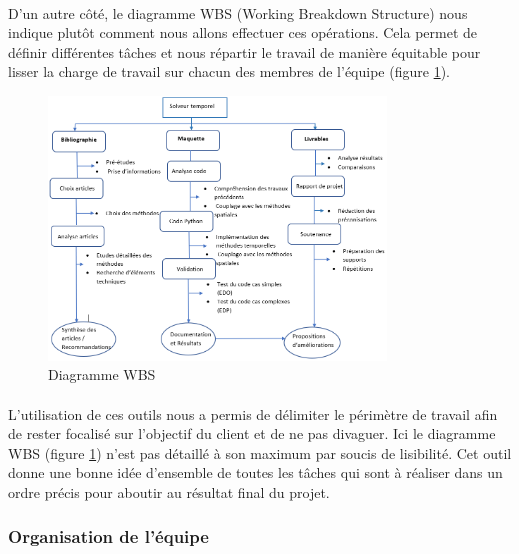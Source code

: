         \paragraph{}
        D'un autre côté, le diagramme WBS (Working Breakdown Structure) nous indique plutôt comment nous allons effectuer ces opérations. Cela permet de définir différentes tâches et nous répartir le travail de manière équitable pour lisser la charge de travail sur chacun des membres de l'équipe (figure \ref{WBS}).
        \begin{figure}
            \centering
            \includegraphics[width=0.8\textwidth]{images/wbs.png}
            \caption{Diagramme WBS}
            \label{WBS}
        \end{figure}

        \paragraph{}
        L'utilisation de ces outils nous a permis de délimiter le périmètre de travail afin de rester focalisé sur l'objectif du client et de ne pas divaguer. Ici le diagramme WBS (figure \ref{WBS}) n'est pas détaillé à son maximum par soucis de lisibilité. Cet outil donne une bonne idée d'ensemble de toutes les tâches qui sont à réaliser dans un ordre précis pour aboutir au résultat final du projet. 

    \subsubsection{Organisation de l'équipe}
